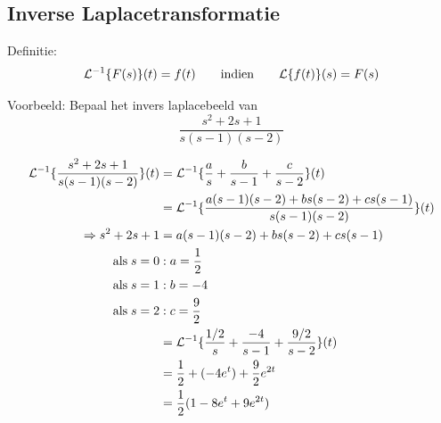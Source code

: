 \documentclass[12pt]{report}
\newcommand{\example}[2]{
    \hrulefill
    
    Voorbeeld: #1
    
    #2
    
    \hrulefill
}
\begin{document}
\subsection{Inverse Laplacetransformatie}
Definitie:
$$\mathcal{L}^{-1}\{F(s)\}(t) = f(t) \qquad \hbox{indien} \qquad \mathcal{L}\{f(t)\}(s) = F(s)$$
\example{Bepaal het invers laplacebeeld van 
        $$\frac{s^2 + 2s + 1}{s(s-1)(s-2)}$$
    }{
        \begin{equation*}
         \begin{split}
          \mathcal{L}^{-1}\{\frac{s^2 + 2s + 1}{s(s-1)(s-2)}\}(t) & = \mathcal{L}^{-1}\{\frac{a}{s} + \frac{b}{s-1} + \frac{c}{s-2}\}(t) \\
                                                                  & = \mathcal{L}^{-1}\{\frac{a(s-1)(s-2) + bs(s-2) + cs(s-1)}{s(s-1)(s-2)}\}(t) \\
                                                       \Rightarrow s^2 + 2s + 1 & = a(s-1)(s-2) + bs(s-2) + cs(s-1) \\
                                                            \hbox{als}\;s = 0 & : a = \frac{1}{2} \\
                                                            \hbox{als}\;s = 1 & : b = -4\\
                                                            \hbox{als}\;s = 2 & : c = \frac{9}{2} \\     
                                                                  & = \mathcal{L}^{-1}\{\frac{1/2}{s} + \frac{-4}{s-1} + \frac{9/2}{s-2}\}(t) \\
                                                                  & = \frac{1}{2} + (-4e^{t}) + \frac{9}{2}e^{2t} \\
                                                                  & = \frac{1}{2}(1 - 8e^{t} + 9e^{2t})
         \end{split}
        \end{equation*}
    }
\end{document}
